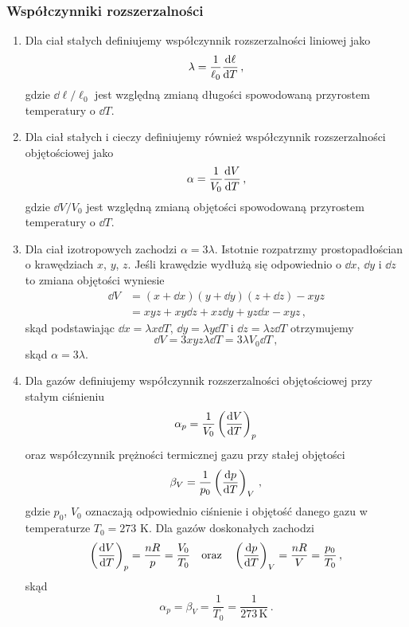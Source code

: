 \documentclass[../main.tex]{subfiles}
\begin{document}
\subsubsection{Współczynniki rozszerzalności}
\begin{enumerate}
    \item Dla ciał stałych definiujemy współczynnik rozszerzalności liniowej jako
\begin{equation*}
    \lambda=\frac{1}{\ell_0}\dv{\ell}{T}\,,
\end{equation*}
gdzie \(\dd\ell/\ell_0\) jest względną zmianą długości spowodowaną przyrostem temperatury o
\(\dd{T}\).
\item Dla ciał stałych i cieczy definiujemy również współczynnik rozszerzalności objętościowej jako
\begin{equation*}
    \alpha=\frac{1}{V_0}\dv{V}{T}\,,
\end{equation*}
gdzie \(\dd V/V_0\) jest względną zmianą objętości spowodowaną przyrostem temperatury o \(\dd{T}\).
\item Dla ciał izotropowych zachodzi \(\alpha=3\lambda\). Istotnie rozpatrzmy prostopadłościan o
krawędziach \(x\), \(y\), \(z\). Jeśli krawędzie wydłużą się odpowiednio o \(\dd x\), \(\dd y\) i
\(\dd z\) to zmiana objętości wyniesie
\begin{equation*}
\begin{split}
    \dd{V}&=(x+\dd x)(y+\dd y)(z+\dd z)-xyz\\
    &=xyz+xy\dd{z}+xz\dd{y}+yz\dd{x}-xyz\,,
\end{split}
\end{equation*}
skąd podstawiając \(\dd{x}=\lambda x\dd{T}\), \(\dd{y}=\lambda y\dd{T}\) i \(\dd{z}=\lambda
z\dd{T}\) otrzymujemy
\begin{equation*}
    \dd{V}=3xyz\lambda \dd{T=3\lambda V_0\dd{T}}\,,
\end{equation*}
skąd \(\alpha=3\lambda\).
\item Dla gazów definiujemy współczynnik rozszerzalności objętościowej przy stałym ciśnieniu
\begin{equation*}
    \alpha_p=\frac{1}{V_0}\left(\dv{V}{T}\right)_p
\end{equation*}
oraz współczynnik prężności termicznej gazu przy stałej objętości
\begin{equation*}
    \beta_V=\frac{1}{p_0}\left(\dv{p}{T}\right)_V\,,
\end{equation*}
gdzie \(p_0\), \(V_0\) oznaczają odpowiednio ciśnienie i objętość danego gazu w temperaturze
\(T_0=273\) K. Dla gazów doskonałych zachodzi
\begin{equation*}
    \left(\dv{V}{T}\right)_p=\frac{nR}{p}=\frac{V_0}{T_0}\quad\text{oraz}\quad \left(\dv{p}{T}\right)_V=\frac{nR}{V}=\frac{p_0}{T_0}\,,
\end{equation*}
skąd
\begin{equation*}
    \alpha_p=\beta_V=\frac{1}{T_0}=\frac{1}{273\,\text{K}}\,.
\end{equation*}
\end{enumerate}
\end{document}
